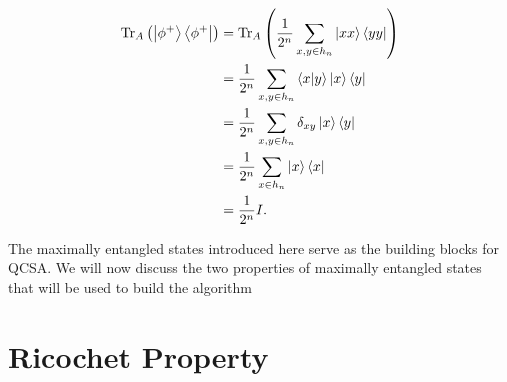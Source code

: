 \documentclass[Dual]{msu-thesis}
\begin{document}
\begin{align}
\text{Tr}_A
\left(
\ket{\phi^+}\bra{\phi^+}
\right)
&=
\text{Tr}_A
\left(
\frac{1}{2^n}
\sum_{x,y\in h_n}\ket{xx}\bra{yy}
\right)
\nonumber
\\
&=
\frac{1}{2^n}
\sum_{x,y\in h_n}\bra{x}\ket{y}\ket{x}\bra{y}
\nonumber
\\
&=
\frac{1}{2^n}
\sum_{x,y\in h_n}\delta_{xy}\ket{x}\bra{y}
\nonumber
\\
&=
\frac{1}{2^n}
\sum_{x\in h_n}\ket{x}\bra{x}
\nonumber
\\
&=
\frac{1}{2^n}I
.\end{align}

The maximally entangled states introduced here serve as the building blocks for QCSA. We will now discuss the two properties of maximally entangled states that will be used to build the algorithm

\section{Ricochet Property}
\end{document}
